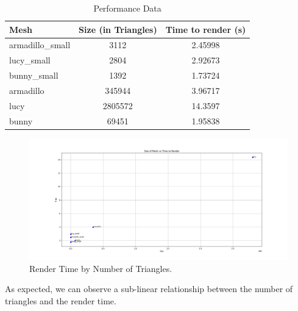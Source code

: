 \documentclass{article}
\begin{document}
\begin{table}[h]
  \centering
  \caption{Performance Data}
  \begin{tabular}{lcc}
    \toprule
    \textbf{Mesh}    & \textbf{Size (in Triangles)} & \textbf{Time to render (s)} \\
    \midrule
    armadillo\_small & 3112                         & 2.45998                     \\
    lucy\_small      & 2804                         & 2.92673                     \\
    bunny\_small     & 1392                         & 1.73724                     \\
    armadillo        & 345944                       & 3.96717                     \\
    lucy             & 2805572                      & 14.3597                     \\
    bunny            & 69451                        & 1.95838                     \\
    \bottomrule
  \end{tabular}
\end{table}


\begin{figure}[H]
  \caption{Render Time by Number of Triangles.}
  \includegraphics[width=\linewidth]{Figure_1.png}
\end{figure}


As expected, we can observe a sub-linear relationship between the number of triangles and the render time.
\end{document}
